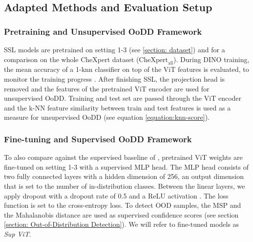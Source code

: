 \subsection{Adapted Methods and Evaluation Setup}
\label{section: adapted-methods}
\subsubsection{Pretraining and Unsupervised OoDD Framework}
SSL models are pretrained on setting 1-3 (see \ref{section: dataset}) and for a comparison on the whole CheXpert dataset ($\text{CheXpert}_\text{all}$).
During  DINO training, the mean accuracy of a 1-knn classifier on top of the ViT features is evaluated, to monitor the training progress \citep{Wu2018,Caron2021}.
After finishing SSL, the projection head is removed \citep{Caron2021,Chen2020} and the features of the pretrained ViT encoder are used for unsupervised OoDD.
Training and test set are passed through the ViT encoder and the k-NN feature similarity between train and test features is used as a measure for unsupervised OoDD (see equation \ref{equation:knn-score}).
\par
\subsubsection{Fine-tuning and Supervised OoDD Framework}
To also compare against the supervised baseline of \citep{Berger2021}, pretrained ViT weights are fine-tuned on setting 1-3 with a supervised MLP head.
The MLP head consists of two fully connected layers with a hidden dimension of 256, an output dimension that is set to the number of in-distribution classes.
Between the linear layers, we apply dropout with a dropout rate of 0.5 \citep{Srivastava2014} and a ReLU activation \citep{Agarap2018}.
The loss function is set to the cross-entropy loss. 
To detect OOD samples, the MSP and the Mahalanobis distance are used as supervised confidence scores (see section \ref{section: Out-of-Distribution Detection}).
We will refer to fine-tuned models as \textit{Sup ViT}.
\par
